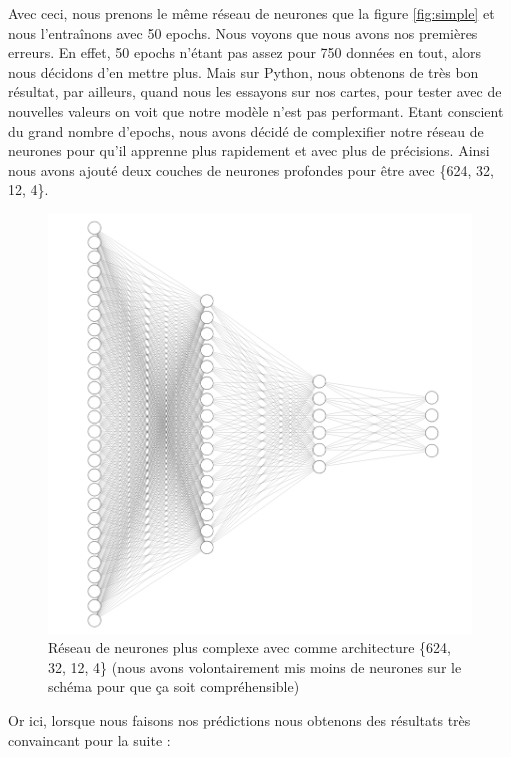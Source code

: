 \documentclass[a4paper,11pt]{article}
\begin{document}
Avec ceci, nous prenons le même réseau de neurones que la figure \ref{fig:simple} et nous l'entraînons avec 50 epochs. Nous voyons que nous avons nos premières erreurs. En effet, 50 epochs n'étant pas assez pour 750 données en tout, alors nous décidons d'en mettre plus. Mais sur Python, nous obtenons de très bon résultat, par ailleurs, quand nous les essayons sur nos cartes, pour tester avec de nouvelles valeurs on voit que notre modèle n'est pas performant. Etant conscient du grand nombre d'epochs, nous avons décidé de complexifier notre réseau de neurones pour qu'il apprenne plus rapidement et avec plus de précisions. Ainsi nous avons ajouté deux couches de neurones profondes pour être avec \{624, 32, 12, 4\}.
\begin{figure}[H]
\centering
\includegraphics[scale=0.4]{images/cnn7.png}
\caption{Réseau de neurones plus complexe avec comme architecture \{624, 32, 12, 4\} (nous avons volontairement mis moins de neurones sur le schéma pour que ça soit compréhensible)}
\end{figure}
Or ici, lorsque nous faisons nos prédictions nous obtenons des résultats très convaincant pour la suite : 
\end{document}
